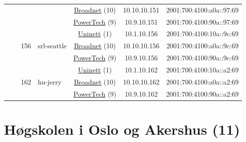\begin{small}
\begin{center}
\begin{longtable}{|c|c|c|c|c|c|c|c|}
  &  &  &  & \multicolumn{2}{|c|}{\tiny{\href{https://www.broadnet.no}{Broadnet} (10)}} & \tiny{10.10.10.151} & \tiny{2001:700:4100:a0a::97:69} \\* \cline{5-5}\cline{6-6}\cline{7-7}\cline{8-8}
  &  &  &  & \multicolumn{2}{|c|}{\tiny{\href{http://www.powertech.no}{PowerTech} (9)}} & \tiny{10.9.10.151} & \tiny{2001:700:4100:90a::97:69} \\* \cline{3-3}\cline{4-4}\cline{5-5}\cline{6-6}\cline{7-7}\cline{8-8}
  &  & \multirow{3}{*}{\tiny{156}} & \multicolumn{1}{|l|}{\multirow{3}{*}{\tiny{srl-seattle}}} & \multicolumn{2}{|c|}{\tiny{\href{https://www.uninett.no}{Uninett} (1)}} & \tiny{10.1.10.156} & \tiny{2001:700:4100:10a::9c:69} \\* \cline{5-5}\cline{6-6}\cline{7-7}\cline{8-8}
  &  &  &  & \multicolumn{2}{|c|}{\tiny{\href{https://www.broadnet.no}{Broadnet} (10)}} & \tiny{10.10.10.156} & \tiny{2001:700:4100:a0a::9c:69} \\* \cline{5-5}\cline{6-6}\cline{7-7}\cline{8-8}
  &  &  &  & \multicolumn{2}{|c|}{\tiny{\href{http://www.powertech.no}{PowerTech} (9)}} & \tiny{10.9.10.156} & \tiny{2001:700:4100:90a::9c:69} \\* \cline{3-3}\cline{4-4}\cline{5-5}\cline{6-6}\cline{7-7}\cline{8-8}
  &  & \multirow{3}{*}{\tiny{162}} & \multicolumn{1}{|l|}{\multirow{3}{*}{\tiny{hu-jerry}}} & \multicolumn{2}{|c|}{\tiny{\href{https://www.uninett.no}{Uninett} (1)}} & \tiny{10.1.10.162} & \tiny{2001:700:4100:10a::a2:69} \\* \cline{5-5}\cline{6-6}\cline{7-7}\cline{8-8}
  &  &  &  & \multicolumn{2}{|c|}{\tiny{\href{https://www.broadnet.no}{Broadnet} (10)}} & \tiny{10.10.10.162} & \tiny{2001:700:4100:a0a::a2:69} \\* \cline{5-5}\cline{6-6}\cline{7-7}\cline{8-8}
  &  &  &  & \multicolumn{2}{|c|}{\tiny{\href{http://www.powertech.no}{PowerTech} (9)}} & \tiny{10.9.10.162} & \tiny{2001:700:4100:90a::a2:69} \\ \hline
\end{longtable}
\end{center}
\end{small}



\section{Høgskolen i Oslo og Akershus (11)}
\label{sec:HiOA}

